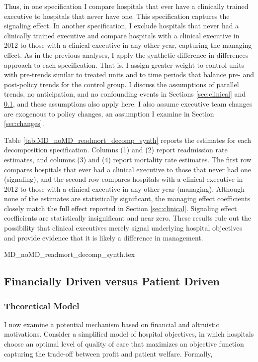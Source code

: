 \documentclass[12pt]{article}
\begin{document}
    Thus, in one specification I compare hospitals that ever have a clinically trained executive to hospitals that never have one. This specification captures the signaling effect. In another specification, I exclude hospitals that never had a clinically trained executive and compare hospitals with a clinical executive in 2012 to those with a clinical executive in any other year, capturing the managing effect. As in the previous analyses, I apply the synthetic difference-in-differences approach to each specification. That is, I assign greater weight to control units with pre-trends similar to treated units and to time periods that balance pre- and post-policy trends for the control group. I discuss the assumptions of parallel trends, no anticipation, and no confounding events in Sections \ref{sec:clinical} and \ref{sec:forprofit}, and these assumptions also apply here. I also assume executive team changes are exogenous to policy changes, an assumption I examine in Section \ref{sec:changes}. 


    Table \ref{tab:MD_noMD_readmort_decomp_synth} reports the estimates for each decomposition specification. Columns (1) and (2) report readmission rate estimates, and columns (3) and (4) report mortality rate estimates. The first row compares hospitals that ever had a clinical executive to those that never had one (signaling), and the second row compares hospitals with a clinical executive in 2012 to those with a clinical executive in any other year (managing). Although none of the estimates are statistically significant, the managing effect coefficients closely match the full effect reported in Section \ref{sec:clinical}. Signaling effect coefficients are statistically insignificant and near zero. These results rule out the possibility that clinical executives merely signal underlying hospital objectives and provide evidence that it is likely a difference in management. 

    {MD_noMD_readmort_decomp_synth.tex}

    \subsection{Financially Driven versus Patient Driven}\label{sec:forprofit}

    \subsubsection{Theoretical Model}

    I now examine a potential mechanism based on financial and altruistic motivations. Consider a simplified model of hospital objectives, in which hospitals choose an optimal level of quality of care that maximizes an objective function capturing the trade-off between profit and patient welfare. Formally, 
    
\end{document}
